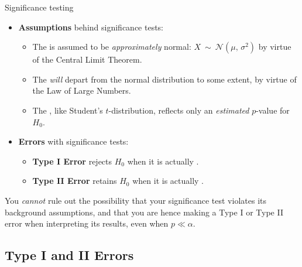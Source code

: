 \documentclass{beamer}
\begin{document}
	\begin{frame}[t]{Significance testing}
			
		\begin{itemize}

			\item \textbf{Assumptions} behind significance tests:
			
				\begin{itemize}
					\item The  is assumed to be \textit{approximately} normal: $X\ \sim\ \mathcal{N}(\mu,\,\sigma^2)$ by virtue of the Central Limit Theorem.	
					\item The  \textit{will} depart from the normal distribution to some extent, by virtue of the Law of Large Numbers.
					\item The , like Student's $t$-distribution, reflects only an \textit{estimated} $p$-value for $H_0$.
				\end{itemize}
			
			\item \textbf{Errors} with significance tests:
			
				\begin{itemize}
					\item \textbf{Type I Error} rejects $H_0$ when it is actually .
					\item \textbf{Type II Error} retains $H_0$ when it is actually .
				\end{itemize}
		\end{itemize}

		You \textit{cannot} rule out the possibility that your significance test violates its background assumptions, and that you are hence making a Type I or Type II error when interpreting its results, even when $p \ll \alpha$.
	\end{frame}	

	\subsection{Type I and II Errors}
	
\end{document}

